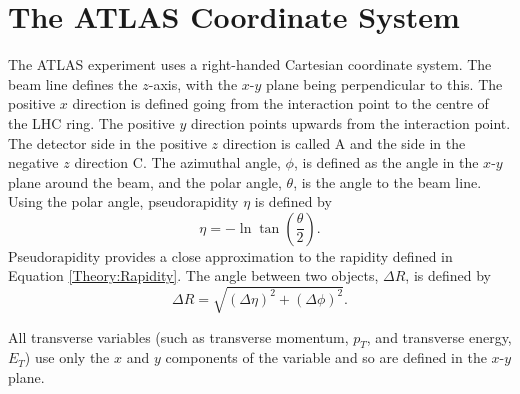 \section{The ATLAS Coordinate System}
\label{sec:Det:Coord}
The ATLAS experiment uses a right-handed Cartesian coordinate system. 
The beam line defines the $z$-axis, with the $x$-$y$ plane being perpendicular to this. 
The positive $x$ direction is defined going from the interaction point to the centre of the LHC ring. 
The positive $y$ direction points upwards from the interaction point. 
The detector side in the positive $z$ direction is called A and the side in the negative $z$ direction C.
The azimuthal angle, $\phi$, is defined as the angle in the $x$-$y$ plane around the beam, and the polar angle, $\theta$, is the angle to the beam line.
Using the polar angle, pseudorapidity $\eta$ is defined by 
\begin{equation}
\eta = - \ln \tan \left(\frac{\theta}{2}\right).
\label{Detector:eta}
\end{equation}
Pseudorapidity provides a close approximation to the rapidity defined in Equation \ref{Theory:Rapidity}.
The angle between two objects, $\Delta R$, is defined by 
\begin{equation}
\Delta R = \sqrt{(\Delta \eta)^2+(\Delta \phi)^2} .
\label{Detector:dR}
\end{equation}

All transverse variables (such as transverse momentum, $p_T$, and transverse energy, $E_T$) use only the $x$ and $y$ components of the variable and so are defined in the $x$-$y$ plane.
